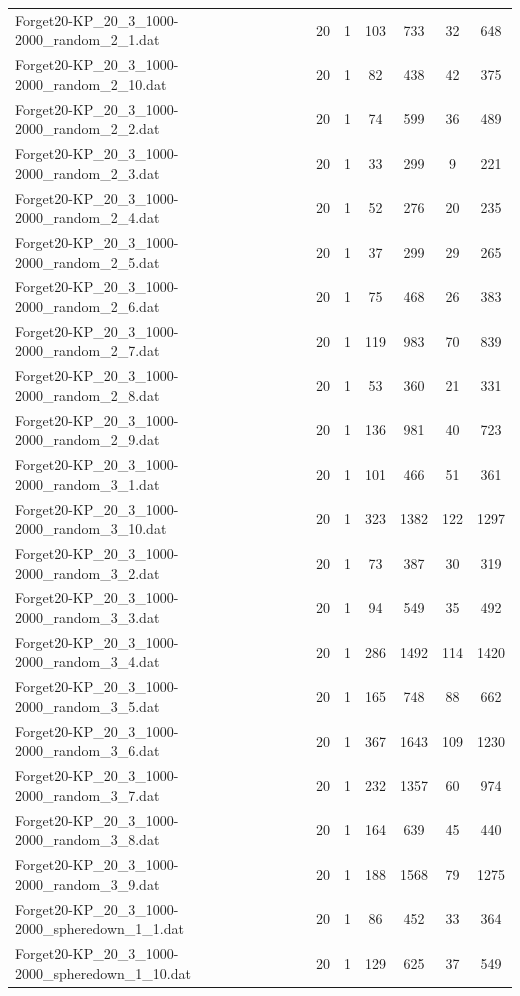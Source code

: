 \begin{table}[!ht]
\begin{tabular}{lcccccc}
Forget20-KP\_20\_3\_1000-2000\_random\_2\_1.dat & 20 & 1 & 103 & 733 & 32 & 648 \\
Forget20-KP\_20\_3\_1000-2000\_random\_2\_10.dat & 20 & 1 & 82 & 438 & 42 & 375 \\
Forget20-KP\_20\_3\_1000-2000\_random\_2\_2.dat & 20 & 1 & 74 & 599 & 36 & 489 \\
Forget20-KP\_20\_3\_1000-2000\_random\_2\_3.dat & 20 & 1 & 33 & 299 & 9 & 221 \\
Forget20-KP\_20\_3\_1000-2000\_random\_2\_4.dat & 20 & 1 & 52 & 276 & 20 & 235 \\
Forget20-KP\_20\_3\_1000-2000\_random\_2\_5.dat & 20 & 1 & 37 & 299 & 29 & 265 \\
Forget20-KP\_20\_3\_1000-2000\_random\_2\_6.dat & 20 & 1 & 75 & 468 & 26 & 383 \\
Forget20-KP\_20\_3\_1000-2000\_random\_2\_7.dat & 20 & 1 & 119 & 983 & 70 & 839 \\
Forget20-KP\_20\_3\_1000-2000\_random\_2\_8.dat & 20 & 1 & 53 & 360 & 21 & 331 \\
Forget20-KP\_20\_3\_1000-2000\_random\_2\_9.dat & 20 & 1 & 136 & 981 & 40 & 723 \\
Forget20-KP\_20\_3\_1000-2000\_random\_3\_1.dat & 20 & 1 & 101 & 466 & 51 & 361 \\
Forget20-KP\_20\_3\_1000-2000\_random\_3\_10.dat & 20 & 1 & 323 & 1382 & 122 & 1297 \\
Forget20-KP\_20\_3\_1000-2000\_random\_3\_2.dat & 20 & 1 & 73 & 387 & 30 & 319 \\
Forget20-KP\_20\_3\_1000-2000\_random\_3\_3.dat & 20 & 1 & 94 & 549 & 35 & 492 \\
Forget20-KP\_20\_3\_1000-2000\_random\_3\_4.dat & 20 & 1 & 286 & 1492 & 114 & 1420 \\
Forget20-KP\_20\_3\_1000-2000\_random\_3\_5.dat & 20 & 1 & 165 & 748 & 88 & 662 \\
Forget20-KP\_20\_3\_1000-2000\_random\_3\_6.dat & 20 & 1 & 367 & 1643 & 109 & 1230 \\
Forget20-KP\_20\_3\_1000-2000\_random\_3\_7.dat & 20 & 1 & 232 & 1357 & 60 & 974 \\
Forget20-KP\_20\_3\_1000-2000\_random\_3\_8.dat & 20 & 1 & 164 & 639 & 45 & 440 \\
Forget20-KP\_20\_3\_1000-2000\_random\_3\_9.dat & 20 & 1 & 188 & 1568 & 79 & 1275 \\
Forget20-KP\_20\_3\_1000-2000\_spheredown\_1\_1.dat & 20 & 1 & 86 & 452 & 33 & 364 \\
Forget20-KP\_20\_3\_1000-2000\_spheredown\_1\_10.dat & 20 & 1 & 129 & 625 & 37 & 549 \\

\end{tabular}
\end{table}
